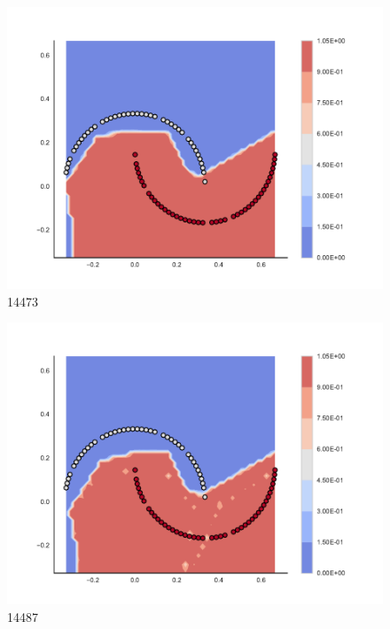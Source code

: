 \begin{subfigure}[b]{0.09\textwidth}
    \includegraphics[clip, trim=2.35cm 1.75cm 4.5cm 0cm,width=\textwidth]{img/convergence/14473.pdf}
    \caption{14473}
    \label{fig:convergence_14473}
\end{subfigure}
%
\begin{subfigure}[b]{0.09\textwidth}
    \includegraphics[clip, trim=2.35cm 1.75cm 4.5cm 0cm,width=\textwidth]{img/convergence/14487.pdf}
    \caption{14487}
    \label{fig:convergence_14487}
\end{subfigure}
%
